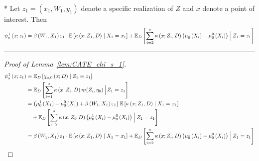 \begin{lem}\label{lem:CATE_chi_s_1}\mbox{}\\*
	Let $z_1 = (x_1, W_{1}, y_1)$ denote a specific realization of $Z$ and $x$ denote a point of interest.
	Then
	\begin{equation}
		\psi_{s}^{1}\left(x; z_1\right)
		= \beta\left(W_{1}, X_1\right)\varepsilon_{1} \cdot \mathbb{E}\left[\kappa\left(x; Z_1, D\right) \; \middle| \; X_1 = x_1\right]
		+ \mathbb{E}_{D}\left[\sum_{i = 2}^{s} \kappa\left(x; Z_{i}, D\right) \left(\mu_{0}^{1}\left(X_{i}\right) - \mu_{0}^{0}\left(X_{i}\right)\right)
		\, \Big| \, Z_1 = z_1 \right]
	\end{equation}
\end{lem}
\hrule
\begin{proof}[Proof of Lemma~\ref{lem:CATE_chi_s_1}]
	\begin{equation}
		\begin{aligned}
			\psi_{s}^{1}\left(x; z_1\right)
			 & = \mathbb{E}_{D}\left[\chi_{s,0}\left(x; D\right) \, | \, Z_1 = z_1 \right] \\
			 & = \mathbb{E}_{D}\left[\sum_{i = 1}^{s} \kappa\left(x; Z_{i}, D\right) m(Z_i, \eta_0)
			 \, \Big| \, Z_1 = z_1 \right]\\
			 & = \left(\mu_{0}^{1}\left(X_1\right) - \mu_{0}^{0}\left(X_1\right) + \beta\left(W_{1}, X_1\right)\varepsilon_{1}\right)\mathbb{E}\left[\kappa\left(x; Z_1, D\right) \; \middle| \; X_1 = x_1\right]\\
			 & \quad + \mathbb{E}_{D}\left[\sum_{i = 2}^{s} \kappa\left(x; Z_{i}, D\right) \left(\mu_{0}^{1}\left(X_{i}\right) - \mu_{0}^{0}\left(X_{i}\right)\right)
			 \, \Big| \, Z_1 = z_1 \right]\\
			 & = \beta\left(W_{1}, X_1\right)\varepsilon_{1} \cdot \mathbb{E}\left[\kappa\left(x; Z_1, D\right) \; \middle| \; X_1 = x_1\right]
			 + \mathbb{E}_{D}\left[\sum_{i = 2}^{s} \kappa\left(x; Z_{i}, D\right) \left(\mu_{0}^{1}\left(X_{i}\right) - \mu_{0}^{0}\left(X_{i}\right)\right)
			 \, \Big| \, Z_1 = z_1 \right]
		\end{aligned}
	\end{equation}
\end{proof}


